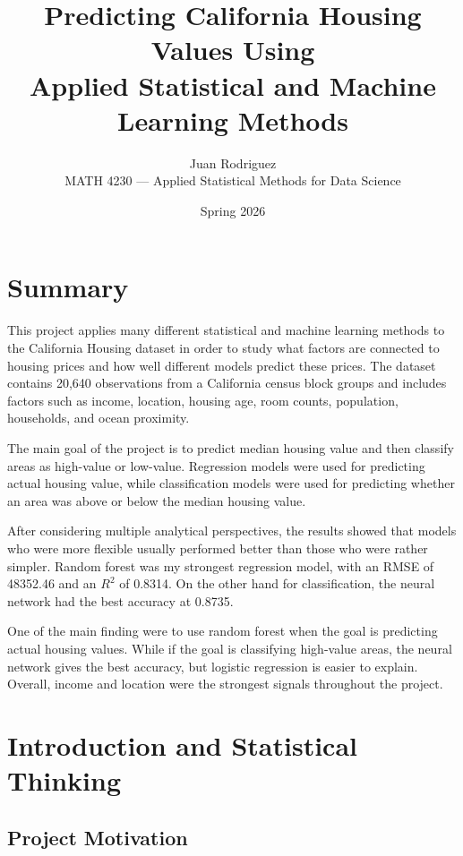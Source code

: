 \documentclass[12pt]{report}
\title{
\vspace{-2cm}
Predicting California Housing Values Using \\
Applied Statistical and Machine Learning Methods
}
\author{
Juan Rodriguez \\
MATH 4230 --- Applied Statistical Methods for Data Science
}
\date{Spring 2026}
\begin{document}
\maketitle
\thispagestyle{empty}
\newpage

\chapter*{ Summary}

This project applies many different statistical and machine learning methods to the California Housing dataset in order to study what factors are connected to housing prices and how well different models predict these prices. The dataset contains 20,640 observations from a California census block groups and includes factors such as income, location, housing age, room counts, population, households, and ocean proximity.

The main goal of the project is to predict median housing value and then classify areas as high-value or low-value. Regression models were used for predicting actual housing value, while classification models were used for predicting whether an area was above or below the median housing value.

After considering multiple analytical perspectives, the results showed that models who were more flexible usually performed better than those who were rather simpler. Random forest was my strongest regression model, with an RMSE of 48352.46 and an $R^2$ of 0.8314. On the other hand for classification, the neural network had the best accuracy at 0.8735.

One of the main finding were to use random forest when the goal is predicting actual housing values. While if the goal is classifying high-value areas, the neural network gives the best accuracy, but logistic regression is easier to explain. Overall, income and location were the strongest signals throughout the project.

\newpage

\tableofcontents
\newpage
\listoffigures
\newpage
\listoftables
\newpage

\chapter{Introduction and Statistical Thinking}

\section{Project Motivation}
\end{document}
